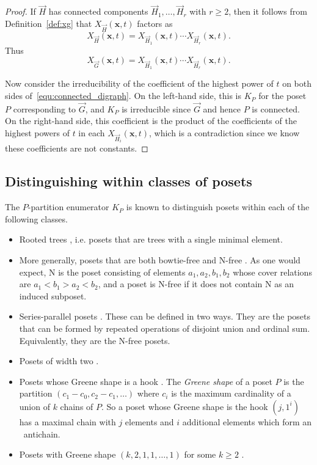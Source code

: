\documentclass[ALCO,Unicode,published]{cedram}
\newcommand{\diG}{\overrightarrow{G}}
\newcommand{\diH}{\overrightarrow{H}}
\newcommand{\x}{\mathbf{x}}
\begin{document}
\begin{proof}
If $\diH$ has connected components $\diH_1, \ldots, \diH_r$ with $r\geq 2$, then it follows from Definition~\ref{def:xg} that $X_{\diH}(\x,t)$ factors as 
\[
X_{\diH}(\x,t) = X_{\diH_1}(\x,t) \cdots X_{\diH_r}(\x,t).
\]
Thus
\begin{equation}\label{equ:connected_digraph}
X_{\diG}(\x,t) = X_{\diH_1}(\x,t) \cdots X_{\diH_r}(\x,t).
\end{equation}

Now consider the irreducibility of the coefficient of the highest power of $t$ on both sides of~\eqref{equ:connected_digraph}.  On the left-hand side, this is $K_P$ for the poset $P$ corresponding to $\diG$, and $K_P$ is irreducible since $\diG$ and hence $P$ is connected.  On the right-hand side, this coefficient is the product of the coefficients of the highest powers of $t$ in each $X_{\diH_i}(\x,t)$, which is a contradiction since we know these coefficients are not constants.  
\end{proof}

\subsection{Distinguishing within classes of posets}\label{sub:classes}

The $P$-partition enumerator $K_P$ is known to distinguish posets within each of the following classes.  
\begin{itemize}
\item Rooted trees \cite{HaTs17,Zho20+}, i.e. posets that are trees with a single minimal element.
\item More generally, posets that are both bowtie-free and \textsf{N}-free \cite{HaTs17}.  As one would expect, \textsf{N} is the poset consisting of elements $a_1,a_2,b_1,b_2$ whose cover relations are $a_1 < b_1 > a_2 < b_2$, and a poset is \textsf{N}-free if it does not contain \textsf{N} as an induced subposet.
\item Series-parallel posets \cite[Theorem~5.2]{LiWe21}.  These can be defined in two ways.  They are the posets that can be formed by repeated operations of disjoint union and ordinal sum.  Equivalently, they are the \textsf{N}-free posets. 
\item Posets of width two \cite{LiWe20}.
\item Posets whose Greene shape is a hook \cite{LiWe20}.  The \emph{Greene shape} of a poset $P$ is the partition $(c_1-c_0, c_2-c_1, \ldots)$ where $c_i$ is the maximum cardinality of a union of $k$ chains of $P$.  So a poset whose Greene shape is the hook $(j, 1^i)$ has a maximal chain with $j$ elements and $i$ additional elements which form an ~antichain. 
\item Posets with Greene shape $(k, 2, 1, 1, \ldots, 1)$ for some $k\geq2$ \cite{LiWe20}.
\end{itemize}
\end{document}
